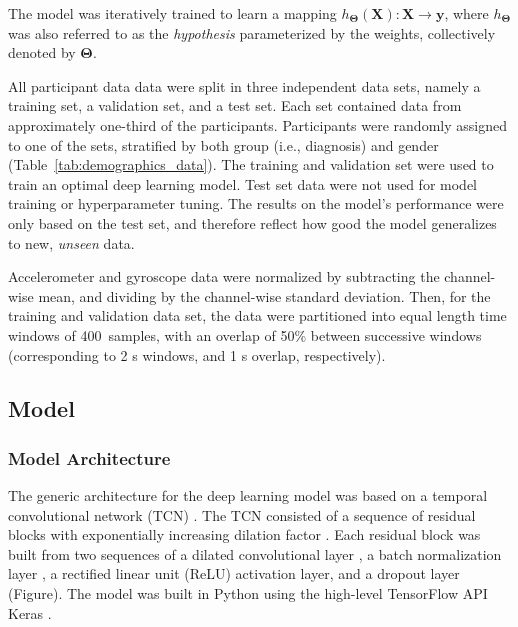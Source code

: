 \documentclass[sensors,article,submit,pdftex,moreauthors]{Definitions/mdpi}
\begin{document}
The model was iteratively trained to learn a mapping $h_{\mathbf{\Theta}}(\mathbf{X}): \mathbf{X} \rightarrow \mathbf{y}$, where $h_{\mathbf{\Theta}}$ was also referred to as the \emph{hypothesis} parameterized by the weights, collectively denoted by $\mathbf{\Theta}$.

All participant data data were split in three independent data sets, namely a training set, a validation set, and a test set. Each set contained data from approximately one-third of the participants. Participants were randomly assigned to one of the sets, stratified by both group (i.e., diagnosis) and gender (Table~\ref{tab:demographics_data}). The training and validation set were used to train an optimal deep learning model. Test set data were not used for model training or hyperparameter tuning. The results on the model's performance were only based on the test set, and therefore reflect how good the model generalizes to new, \emph{unseen} data.

Accelerometer and gyroscope data were normalized by subtracting the channel-wise mean, and dividing by the channel-wise standard deviation. Then, for the training and validation data set, the data were partitioned into equal length time windows \cite{Filtjens2020} of 400~samples, with an overlap of 50\% between successive windows (corresponding to 2 s windows, and 1 s overlap, respectively).

\subsection{Model}
\subsubsection{Model Architecture}
The generic architecture for the deep learning model was based on a temporal convolutional network (TCN) \cite{Bai2018,Remy2020,Filtjens2020}. The TCN consisted of a sequence of residual blocks with exponentially increasing dilation factor \cite{YuKoltun2016,Bai2018}. Each residual block was built from two sequences of a dilated convolutional layer \cite{YuKoltun2016}, a batch normalization layer \cite{Ioffe2015}, a rectified linear unit (ReLU) activation layer, and a dropout layer \cite{Srivastava2014} (Figure). The model was built in Python \cite{VanRossum2009} using the high-level TensorFlow API Keras \cite{Remy2020,Chollet2015}.
\end{document}

